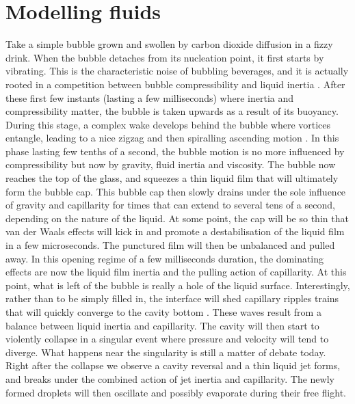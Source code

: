 \newpage
\section*{Modelling fluids}
 Take a simple bubble grown and swollen by carbon dioxide diffusion in a fizzy drink. When the bubble detaches from its nucleation point, it first starts by vibrating. This is the characteristic noise of bubbling beverages, and it is actually rooted in a competition between bubble compressibility and liquid inertia \citep{Minnaert1933}. After these first few instants (lasting a few milliseconds) where inertia and compressibility matter, the bubble is taken upwards as a result of its buoyancy. During this stage, a complex wake develops behind the bubble where vortices entangle, leading to a nice zigzag and then spiralling ascending motion \citep{Mougin2001}. In this phase lasting few tenths of a second, the bubble motion is no more influenced by compressibility but now by gravity, fluid inertia and viscosity. The bubble now reaches the top of the glass, and squeezes a thin liquid film that will ultimately form the bubble cap. This bubble cap then slowly drains under the sole influence of gravity and capillarity for times that can extend to several tens of a second, depending on the nature of the liquid. At some point, the cap will be so thin that van der Waals effects will kick in and promote a destabilisation of the liquid film in a few microseconds. The punctured film will then be unbalanced and pulled away. In this opening regime of a few milliseconds duration, the dominating effects are now the liquid film inertia and the pulling action of capillarity. At this point, what is left of the bubble is really a hole of the liquid surface. Interestingly, rather than to be simply filled in, the interface will shed capillary ripples trains that will quickly converge to the cavity bottom \citep{Ghabache2014a}. These waves result from a balance between liquid inertia and capillarity. The cavity will then start to violently collapse in a singular event where pressure and velocity will tend to diverge. What happens near the singularity is still a matter of debate today. Right after the collapse we observe a cavity reversal and a thin liquid jet forms, and breaks under the combined action of jet inertia and capillarity. The newly formed droplets will then oscillate and possibly evaporate during their free flight.

